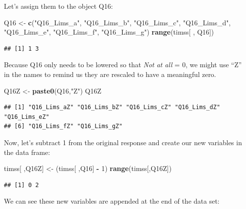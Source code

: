 \documentclass[
]{article}
\newenvironment{Shaded}{\begin{snugshade}}{\end{snugshade}}
\newcommand{\DecValTok}[1]{\textcolor[rgb]{0.00,0.00,0.81}{#1}}
\newcommand{\KeywordTok}[1]{\textcolor[rgb]{0.13,0.29,0.53}{\textbf{#1}}}
\newcommand{\NormalTok}[1]{#1}
\newcommand{\OperatorTok}[1]{\textcolor[rgb]{0.81,0.36,0.00}{\textbf{#1}}}
\newcommand{\StringTok}[1]{\textcolor[rgb]{0.31,0.60,0.02}{#1}}
\begin{document}
Let's assign them to the object Q16:

\begin{Shaded}
\begin{Highlighting}[]
\NormalTok{Q16 <-}\StringTok{ }\KeywordTok{c}\NormalTok{(}\StringTok{"Q16_Lims_a"}\NormalTok{, }\StringTok{"Q16_Lims_b"}\NormalTok{, }\StringTok{"Q16_Lims_c"}\NormalTok{, }\StringTok{"Q16_Lims_d"}\NormalTok{, }\StringTok{"Q16_Lims_e"}\NormalTok{, }
        \StringTok{"Q16_Lims_f"}\NormalTok{, }\StringTok{"Q16_Lims_g"}\NormalTok{)}
\KeywordTok{range}\NormalTok{(timss[ , Q16])}
\end{Highlighting}
\end{Shaded}

\begin{verbatim}
## [1] 1 3
\end{verbatim}

Because Q16 only needs to be lowered so that \emph{Not at all} = \(0\), we might use ``Z'' in the names to remind us they are rescaled to have a meaningful zero.

\begin{Shaded}
\begin{Highlighting}[]
\NormalTok{Q16Z <-}\StringTok{ }\KeywordTok{paste0}\NormalTok{(Q16,}\StringTok{"Z"}\NormalTok{)}
\NormalTok{Q16Z }
\end{Highlighting}
\end{Shaded}

\begin{verbatim}
## [1] "Q16_Lims_aZ" "Q16_Lims_bZ" "Q16_Lims_cZ" "Q16_Lims_dZ" "Q16_Lims_eZ"
## [6] "Q16_Lims_fZ" "Q16_Lims_gZ"
\end{verbatim}

Now, let's subtract 1 from the original response and create our new variables in the data frame:

\begin{Shaded}
\begin{Highlighting}[]
\NormalTok{timss[ ,Q16Z] <-}\StringTok{ }\NormalTok{(timss[ ,Q16] }\OperatorTok{-}\StringTok{ }\DecValTok{1}\NormalTok{) }
\KeywordTok{range}\NormalTok{(timss[,Q16Z])}
\end{Highlighting}
\end{Shaded}

\begin{verbatim}
## [1] 0 2
\end{verbatim}

We can see these new variables are appended at the end of the data set:
\end{document}
